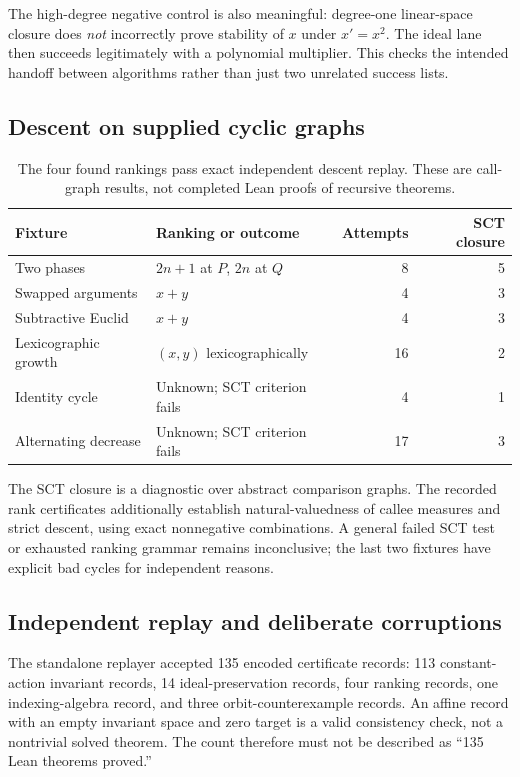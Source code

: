 The high-degree negative control is also meaningful: degree-one linear-space
closure does \emph{not} incorrectly prove stability of $x$ under $x'=x^2$.
The ideal lane then succeeds legitimately with a polynomial multiplier. This
checks the intended handoff between algorithms rather than just two unrelated
success lists.

\subsection{Descent on supplied cyclic graphs}

\begin{table}[ht]
\small
\begin{tabularx}{\textwidth}{@{}p{}Yrr@{}}
\toprule
Fixture & Ranking or outcome & Attempts & SCT closure \\
\midrule
Two phases & $2n+1$ at $P$, $2n$ at $Q$ & 8 & 5 \\
Swapped arguments & $x+y$ & 4 & 3 \\
Subtractive Euclid & $x+y$ & 4 & 3 \\
Lexicographic growth & $(x,y)$ lexicographically & 16 & 2 \\
Identity cycle & Unknown; SCT criterion fails & 4 & 1 \\
Alternating decrease & Unknown; SCT criterion fails & 17 & 3 \\
\bottomrule
\end{tabularx}
\caption{The four found rankings pass exact independent descent replay. These are call-graph results, not completed Lean proofs of recursive theorems.}
\end{table}

The SCT closure is a diagnostic over abstract comparison graphs. The recorded
rank certificates additionally establish natural-valuedness of callee measures
and strict descent, using exact nonnegative combinations. A general failed SCT
test or exhausted ranking grammar remains inconclusive; the last two fixtures
have explicit bad cycles for independent reasons.

\subsection{Independent replay and deliberate corruptions}

The standalone replayer accepted 135 encoded certificate records: 113
constant-action invariant records, 14 ideal-preservation records, four ranking
records, one indexing-algebra record, and three orbit-counterexample records.
An affine record with an empty invariant space and zero target is a valid
consistency check, not a nontrivial solved theorem. The count therefore must not
be described as ``135 Lean theorems proved.''

